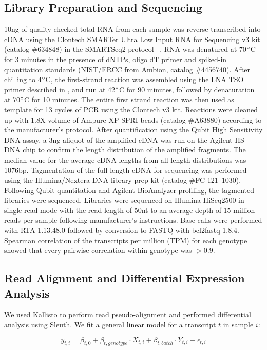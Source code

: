 \documentclass[10pt, onecolumn]{article}
\begin{document}
\subsection*{Library Preparation and Sequencing}
10ng of quality checked total RNA from each sample was
reverse-transcribed into cDNA using the Clontech SMARTer Ultra Low Input RNA for
Sequencing v3 kit (catalog \#634848) in the SMARTSeq2 protocol
~\cite{Picelli2014}.  RNA was denatured at 70$\degree{}$C for 3 minutes
in the presence of dNTPs, oligo dT primer and spiked-in quantitation standards
(NIST/ERCC from Ambion, catalog \#4456740).  After chilling to 4$\degree{}$C, the
first-strand reaction was assembled using the LNA TSO primer described in
\citep{Picelli2014}, and run at 42$\degree{}$C for 90 minutes, followed by
denaturation at 70$\degree{}$C for 10 minutes.  The entire first strand reaction
was then used as template for 13 cycles of PCR using the Clontech v3 kit.
Reactions were cleaned up with 1.8X volume of Ampure XP SPRI beads (catalog
\#A63880) according to the manufacturer’s protocol.  After quantification using
the Qubit High Sensitivity DNA assay, a 3ng aliquot of the amplified cDNA was
run on the Agilent HS DNA chip to confirm the length distribution of the
amplified fragments.  The median value for the average cDNA lengths from all
length distributions was 1076bp.  Tagmentation of the full length cDNA for
sequencing was performed using the Illumina/Nextera DNA library prep kit (catalog
\#FC-121--1030).  Following Qubit quantitation and Agilent BioAnalyzer profiling,
the tagmented libraries were sequenced. Libraries were sequenced on Illumina
HiSeq2500 in single read mode with the read length of 50nt to an average depth
of 15 million reads per sample following manufacturer's instructions. Base calls
were performed with RTA 1.13.48.0 followed by conversion to FASTQ with bcl2fastq
1.8.4. Spearman correlation of the transcripts per million (TPM) for each
genotype showed that every pairwise correlation within genotype was $>0.9$.

\subsection*{Read Alignment and Differential Expression Analysis}
We used Kallisto to perform read pseudo-alignment and performed differential
analysis using Sleuth. We fit a general linear model for a transcript $t$ in
sample $i$:

\begin{equation}
  y_{t,i} = \beta_{t, 0} + \beta_{t, genotype}\cdot{}X_{t, i} +
  \beta_{t, batch}\cdot{}Y_{t, i} + \epsilon_{t, i}
\end{equation}
\end{document}
